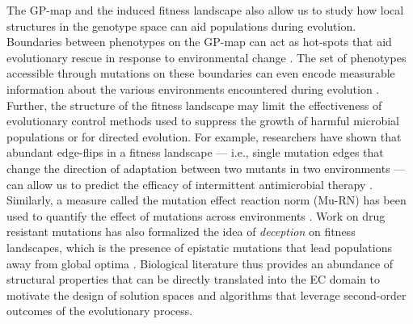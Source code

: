 The GP-map  and the induced fitness landscape also allow us to study how local structures in the genotype space can aid populations during evolution.
Boundaries between phenotypes on the GP-map can act as hot-spots that aid evolutionary rescue in response to environmental change \citep{kumawat2024evolution, ancel2005evolution, kussell2006polymerpopulation}.
The set of phenotypes accessible through mutations on these boundaries can even encode measurable information about the various environments encountered during evolution \citep{kumawat2024evolution}.
Further, the structure of the fitness landscape may limit the effectiveness of evolutionary control methods used to suppress the growth of harmful microbial populations or for directed evolution.
For example, researchers have shown that abundant edge-flips in a fitness landscape --- i.e., single mutation edges that change the direction of adaptation between two mutants in two environments --- can allow us to predict the efficacy of intermittent antimicrobial therapy \citep{chen2024inverted}.
Similarly, a measure called the mutation effect reaction norm (Mu-RN) has been used to quantify the effect of mutations across environments \citep{ogbunugafor2022mutation}.
Work on drug resistant mutations has also formalized the idea of \textit{deception} on fitness landscapes, which is the presence of epistatic mutations that lead populations away from global optima \citep{eppstein2016quantifying, ogbunugafor2016competition}.
Biological literature thus provides an abundance of structural properties that can be directly translated into the EC domain to motivate the design of solution spaces and algorithms that leverage second-order outcomes of the evolutionary process.

